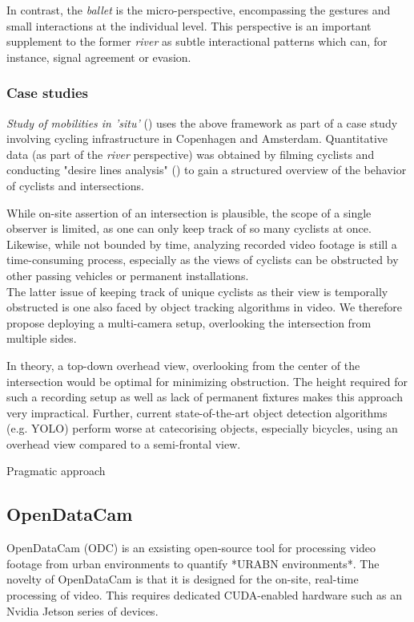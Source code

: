 In contrast, the \textit{ballet} is the micro-perspective, encompassing the gestures and small interactions at the individual level.
This perspective is an important supplement to the former \textit{river} as subtle interactional patterns which can, for instance,
 signal agreement or evasion.

\subsubsection{Case studies}
\textit{Study of mobilities in 'situ'} (\cite{situ}) uses the above framework as part of a case study involving cycling infrastructure in 
Copenhagen and Amsterdam. Quantitative data (as part of the \textit{river} perspective) was obtained by filming cyclists and conducting 
"desire lines analysis" (\cite{cva}) to gain a structured overview of the behavior of cyclists and intersections. 



 While on-site assertion of an intersection is plausible, the scope of a single observer is limited, as one can only keep track of 
 so many cyclists at once. Likewise, while not bounded by time, analyzing recorded video footage is still a time-consuming process, 
 especially as the views of cyclists can be obstructed by other passing vehicles or permanent installations.
\ \\

The latter issue of keeping track of unique cyclists as their view is temporally obstructed is one also faced by 
object tracking algorithms in video. We therefore propose deploying a multi-camera setup, overlooking the intersection from
multiple sides.

In theory, a top-down overhead view, overlooking from the center of the intersection would be optimal for minimizing obstruction.
The height required for such a recording setup as well as lack of permanent fixtures makes this approach very impractical. 
Further, current state-of-the-art object detection algorithms (e.g. YOLO) perform worse at catecorising objects, especially bicycles, 
using an overhead view compared to a semi-frontal view.

Pragmatic approach


\subsection{OpenDataCam}
OpenDataCam (ODC) is an exsisting open-source tool for processing video footage from urban environments to quantify
*URABN environments*. The novelty of OpenDataCam is that it is designed for the on-site, real-time processing of video. 
This requires dedicated CUDA-enabled hardware such as an Nvidia Jetson series of devices. 
\ \\

